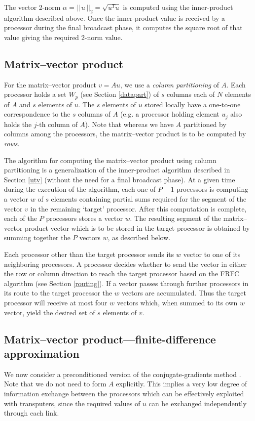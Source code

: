 \documentclass{ecai2014}
\begin{document}
The vector 2-norm $\alpha=||\,u\,||_{2}=\sqrt{u^{T}u}$ is computed
using the inner-product algorithm described above. Once the
inner-product value is received by a processor during the final
broadcast phase, it computes the square root of that value giving the
required 2-norm value.

\subsection{Matrix--vector product}
\label{mv}
For the matrix--vector product $v=Au$, we use a \emph{column
  partitioning} of $A$.  Each processor holds a set $W_{p}$ (see
Section \ref{datapart}) of $s$ columns each of $N$ elements of $A$ and
$s$ elements of $u$.  The $s$ elements of $u$ stored locally have a
one-to-one correspondence to the $s$ columns of $A$ (e.g. a processor
holding element $u_{j}$ also holds the $j$-th column of $A$). Note
that whereas we have $A$ partitioned by columns among the processors,
the matrix--vector product is to be computed by \emph{rows}.

The algorithm for computing the matrix--vector product using column
partitioning is a generalization of the inner-product algorithm
described in Section \ref{utv} (without the need for a final broadcast
phase). At a given time during the execution of the algorithm, each
one of $P-1$ processors is computing a vector $w$ of $s$ elements
containing partial sums required for the segment of the vector $v$ in
the remaining `target' processor.  After this computation is complete,
each of the $P$ processors stores a vector $w$.  The resulting segment
of the matrix--vector product vector which is to be stored in the
target processor is obtained by summing together the $P$ vectors $w$,
as described below.

Each processor other than the target processor sends its $w$ vector to
one of its neighboring processors. A processor decides whether to send
the vector in either the row or column direction to reach the target
processor based on the FRFC algorithm (see Section \ref{routing}). If
a vector passes through further processors in its route to the target
processor the $w$ vectors are accumulated. Thus the target processor
will receive at most four $w$ vectors which, when summed to its own
$w$ vector, yield the desired set of $s$ elements of $v$.

\subsection{Matrix--vector product---finite-difference approximation}
We now consider a preconditioned version of the conjugate-gradients
method \cite{kn:Golub89}. Note that we do not need to form $A$
explicitly.  This implies a very low degree of information exchange
between the processors which can be effectively exploited with
transputers, since the required values of $u$ can be exchanged
independently through each link.
\end{document}
